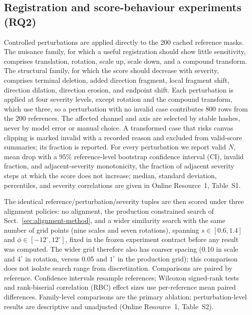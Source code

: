 \subsection{Registration and score-behaviour experiments (RQ2)}
\label{sec:setup-registration}

Controlled perturbations are applied directly to the 200 cached reference
masks. The nuisance family, for which a useful registration should show
little sensitivity, comprises translation, rotation, scale up, scale down,
and a compound transform. The structural family, for which the score should
decrease with severity, comprises terminal deletion, added direction
fragment, local fragment shift, direction dilation, direction erosion, and
endpoint shift. Each perturbation is applied at four severity levels, except
rotation and the compound transform, which use three, so a perturbation with
no invalid case contributes 800 rows from the 200 references. The affected channel and axis are selected by stable hashes, never by model
error or manual choice. A transformed case that risks canvas clipping is
marked invalid with a recorded reason and excluded from valid-score
summaries; its fraction is reported. For every perturbation we report valid
\(N\), mean drop with a 95\% reference-level bootstrap confidence
interval (CI), invalid
fraction, and adjacent-severity monotonicity, the fraction of adjacent
severity steps at which the score does not increase; median, standard
deviation,
percentiles, and severity correlations are given in Online Resource~1,
Table~S1.

The identical reference/perturbation/severity tuples are then scored under
three alignment policies: no alignment, the production constrained search of
Sect.~\ref{sec:alignment-method}, and a wider similarity search with the same
number of grid points (nine scales and seven rotations), spanning
\(s\in[0.6,1.4]\) and \(\phi\in[-12^\circ,12^\circ]\), fixed in the
frozen experiment contract before any result was computed. The wider grid
therefore also has coarser spacing (0.10 in scale and \(4^\circ\) in rotation,
versus 0.05 and \(1^\circ\) in the production grid); this comparison does not
isolate search range from discretization.
Comparisons are paired by reference. Confidence intervals resample
references; Wilcoxon signed-rank tests \cite{wilcoxon1945} and rank-biserial
correlation (RBC) effect sizes use per-reference mean paired differences. Family-level
comparisons are the primary ablation; perturbation-level results are
descriptive and unadjusted (Online Resource~1, Table~S2).

